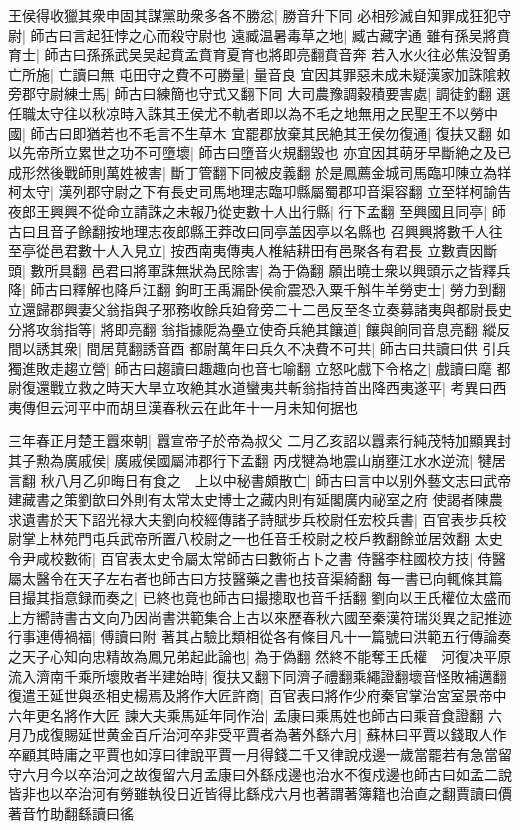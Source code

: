 王侯得收獵其衆申固其謀黨助衆多各不勝忿|{
	勝音升下同}
必相殄滅自知罪成狂犯守尉|{
	師古曰言起狂悖之心而殺守尉也}
遠臧温暑毒草之地|{
	臧古藏字通}
雖有孫吴將賁育士|{
	師古曰孫孫武吴吴起賁孟賁育夏育也將即亮翻賁音奔}
若入水火往必焦没智勇亡所施|{
	亡讀曰無}
屯田守之費不可勝量|{
	量音良}
宜因其罪惡未成未疑漢家加誅隂敕旁郡守尉練士馬|{
	師古曰練簡也守式又翻下同}
大司農豫調穀積要害處|{
	調徒釣翻}
選任職太守往以秋凉時入誅其王侯尤不軌者即以為不毛之地無用之民聖王不以勞中國|{
	師古曰即猶若也不毛言不生草木}
宜罷郡放棄其民絶其王侯勿復通|{
	復扶又翻}
如以先帝所立累世之功不可墮壞|{
	師古曰墮音火規翻毀也}
亦宜因其萌牙早斷絶之及已成形然後戰師則萬姓被害|{
	斷丁管翻下同被皮義翻}
於是鳳薦金城司馬臨卭陳立為䍧柯太守|{
	漢列郡守尉之下有長史司馬地理志臨卭縣屬蜀郡卭音渠容翻}
立至䍧柯諭告夜郎王興興不從命立請誅之未報乃從吏數十人出行縣|{
	行下孟翻}
至興國且同亭|{
	師古曰且音子餘翻按地理志夜郎縣王莽改曰同亭盖因亭以名縣也}
召興興將數千人往至亭從邑君數十人入見立|{
	按西南夷傳夷人椎結耕田有邑聚各有君長}
立數責因斷頭|{
	數所具翻}
邑君曰將軍誅無狀為民除害|{
	為于偽翻}
願出曉士衆以興頭示之皆釋兵降|{
	師古曰釋解也降戶江翻}
鉤町王禹漏卧侯俞震恐入粟千斛牛羊勞吏士|{
	勞力到翻}
立還歸郡興妻父翁指與子邪務收餘兵廹脅旁二十二邑反至冬立奏募諸夷與都尉長史分將攻翁指等|{
	將即亮翻}
翁指據阸為壘立使奇兵絶其饟道|{
	饟與餉同音息亮翻}
縱反間以誘其衆|{
	間居莧翻誘音酉}
都尉萬年曰兵久不决費不可共|{
	師古曰共讀曰供}
引兵獨進敗走趨立營|{
	師古曰趨讀曰趣趣向也音七喻翻}
立怒叱戲下令格之|{
	戲讀曰麾}
都尉復還戰立救之時天大旱立攻絶其水道蠻夷共斬翁指持首出降西夷遂平|{
	考異曰西夷傳但云河平中而胡旦漢春秋云在此年十一月未知何据也}


三年春正月楚王囂來朝|{
	囂宣帝子於帝為叔父}
二月乙亥詔以囂素行純茂特加顯異封其子勲為廣戚侯|{
	廣戚侯國屬沛郡行下孟翻}
丙戌犍為地震山崩壅江水水逆流|{
	犍居言翻}
秋八月乙卯晦日有食之　上以中秘書頗散亡|{
	師古曰言中以别外藝文志曰武帝建藏書之策劉歆曰外則有太常太史博士之藏内則有延閣廣内祕室之府}
使謁者陳農求遺書於天下詔光禄大夫劉向校經傳諸子詩賦步兵校尉任宏校兵書|{
	百官表步兵校尉掌上林苑門屯兵武帝所置八校尉之一也任音壬校尉之校戶教翻餘並居效翻}
太史令尹咸校數術|{
	百官表太史令屬太常師古曰數術占卜之書}
侍醫李柱國校方技|{
	侍醫屬太醫令在天子左右者也師古曰方技醫藥之書也技音渠綺翻}
每一書已向輒條其篇目撮其指意録而奏之|{
	已終也竟也師古曰撮摠取也音千括翻}
劉向以王氏權位太盛而上方嚮詩書古文向乃因尚書洪範集合上古以來歷春秋六國至秦漢符瑞災異之記推迹行事連傅禍福|{
	傅讀曰附}
著其占驗比類相從各有條目凡十一篇號曰洪範五行傳論奏之天子心知向忠精故為鳳兄弟起此論也|{
	為于偽翻}
然終不能奪王氏權　河復决平原流入濟南千乘所壞敗者半建始時|{
	復扶又翻下同濟子禮翻乘繩證翻壞音怪敗補邁翻}
復遣王延世與丞相史楊焉及將作大匠許商|{
	百官表曰將作少府秦官掌治宮室景帝中六年更名將作大匠}
諫大夫乘馬延年同作治|{
	孟康曰乘馬姓也師古曰乘音食證翻}
六月乃成復賜延世黄金百斤治河卒非受平賈者為著外繇六月|{
	蘇林曰平賈以錢取人作卒顧其時庸之平賈也如淳曰律說平賈一月得錢二千又律說戍邊一歲當罷若有急當留守六月今以卒治河之故復留六月孟康曰外繇戍邊也治水不復戍邊也師古曰如孟二說皆非也以卒治河有勞雖執役日近皆得比繇戍六月也著謂著簿籍也治直之翻賈讀曰價著音竹助翻繇讀曰徭}


